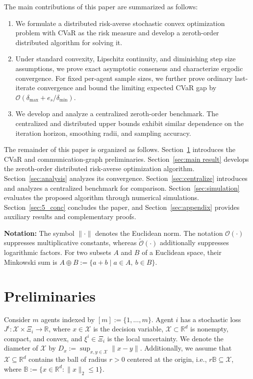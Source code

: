 \documentclass[twocolumn]{autart}    %
\newcommand{\order}[1]{\mathcal{O}\left(#1\right)}
\newcommand{\1}{\mathbf{1}}
\begin{document}
The main contributions of this paper are summarized as follows: 
\begin{enumerate}
    \item   We formulate a distributed risk-averse stochastic convex optimization problem with CVaR as the risk measure and develop a zeroth-order distributed algorithm for solving it. 
    \item Under standard convexity, Lipschitz continuity, and diminishing step size assumptions, we prove exact asymptotic consensus and characterize ergodic convergence. For fixed per-agent sample sizes, we further prove ordinary last-iterate convergence and bound the limiting expected CVaR gap by  $\order{\delta_{\max}+e_s/\delta_{\min}}$.
    \item We develop and analyze a centralized zeroth-order benchmark. The centralized and distributed upper bounds exhibit similar dependence on the iteration horizon, smoothing radii, and sampling accuracy.  
\end{enumerate}
 


The remainder of this paper is organized as follows. 
Section~\ref{sec:preliminary} introduces the CVaR and communication-graph preliminaries.
Section~\ref{sec:main result} develops the zeroth-order distributed risk-averse optimization algorithm. 
Section~\ref{sec:analysis} analyzes its convergence.
Section~\ref{sec:centralize} introduces and analyzes a centralized benchmark for comparison.
Section~\ref{sec:simulation} evaluates the proposed algorithm through numerical simulations.
Section~\ref{sec:5_conc} concludes the paper, 
and Section~\ref{sec:appendix} provides auxiliary results and complementary proofs. 

 
\textbf{Notation:} The symbol $\|\cdot\|$ denotes the Euclidean norm. The notation $\mathcal O(\cdot)$ suppresses multiplicative constants, whereas $\widetilde{\mathcal O}(\cdot)$ additionally suppresses logarithmic factors.  
For two subsets $A$ and $B$ of a Euclidean space, their Minkowski sum is $A\oplus B:=\{a+b\mid a\in A,\ b\in B\}$.
\section{Preliminaries}\label{sec:preliminary}
Consider $m$ agents indexed by $[m]:=\{1,\ldots,m\}$. Agent $i$ has a stochastic loss $J^i:\mathcal X\times\Xi_i\to\mathbb R$, where $x\in\mathcal X$ is the decision variable, $\mathcal X\subset\mathbb R^d$ is nonempty, compact, and convex, and $\xi^i\in\Xi_i$ is the local uncertainty. 
We denote the diameter of $\mathcal X$ by $D_x:=\sup_{x,y\in\mathcal X}\|x-y\|$.
Additionally, we assume that $\mathcal{X}\subseteq \mathbb{R}^d $ contains the ball of radius $r>0$ centered at the origin, i.e.,
 $
r\mathbb{B} \subseteq \mathcal{X}$,
 where 
$\mathbb{B}:=\{x\in\mathbb{R}^d:\|x\|_2\le 1\}.$  
\end{document}
